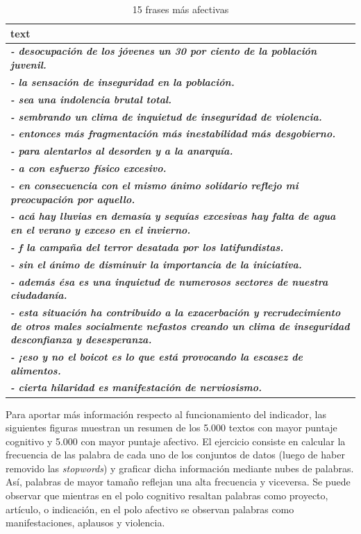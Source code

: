 \documentclass[
  12pt,
]{article}
\begin{document}
\begin{table}[H]

\caption{\label{tab:tabla_frases_afectivas}15 frases más afectivas}
\centering
\fontsize{10}{12}\selectfont
\begin{tabular}[t]{>{\raggedright\arraybackslash}p{25em}}
\toprule
text\\
\midrule
\em{\textbf{- desocupación de los jóvenes un 30 por ciento de la población juvenil.}}\\
\em{\textbf{- la sensación de inseguridad en la población.}}\\
\em{\textbf{- sea una indolencia brutal total.}}\\
\em{\textbf{- sembrando un clima de inquietud de inseguridad de violencia.}}\\
\em{\textbf{- entonces más fragmentación más inestabilidad más desgobierno.}}\\
\addlinespace
\em{\textbf{- para alentarlos al desorden y a la anarquía.}}\\
\em{\textbf{- a con esfuerzo físico excesivo.}}\\
\em{\textbf{- en consecuencia con el mismo ánimo solidario reflejo mi preocupación por aquello.}}\\
\em{\textbf{- acá hay lluvias en demasía y sequías excesivas hay falta de agua en el verano y exceso en el invierno.}}\\
\em{\textbf{- f la campaña del terror desatada por los latifundistas.}}\\
\addlinespace
\em{\textbf{- sin el ánimo de disminuir la importancia de la iniciativa.}}\\
\em{\textbf{- además ésa es una inquietud de numerosos sectores de nuestra ciudadanía.}}\\
\em{\textbf{- esta situación ha contribuido a la exacerbación y recrudecimiento de otros males socialmente nefastos creando un clima de inseguridad desconfianza y desesperanza.}}\\
\em{\textbf{- ¡eso y no el boicot es lo que está provocando la escasez de alimentos.}}\\
\em{\textbf{- cierta hilaridad es manifestación de nerviosismo.}}\\
\bottomrule
\end{tabular}
\end{table}

Para aportar más información respecto al funcionamiento del indicador,
las siguientes figuras muestran un resumen de los 5.000 textos con mayor
puntaje cognitivo y 5.000 con mayor puntaje afectivo. El ejercicio
consiste en calcular la frecuencia de las palabra de cada uno de los
conjuntos de datos (luego de haber removido las \emph{stopwords}) y
graficar dicha información mediante nubes de palabras. Así, palabras de
mayor tamaño reflejan una alta frecuencia y viceversa. Se puede observar
que mientras en el polo cognitivo resaltan palabras como proyecto,
artículo, o indicación, en el polo afectivo se observan palabras como
manifestaciones, aplausos y violencia.
\end{document}
